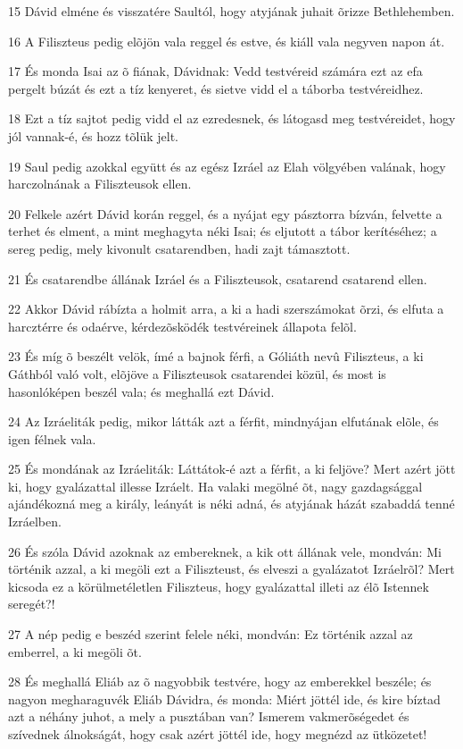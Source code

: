 \par 15 Dávid elméne és visszatére Saultól, hogy atyjának juhait õrizze Bethlehemben.
\par 16 A Filiszteus pedig elõjön vala reggel és estve, és kiáll vala negyven napon át.
\par 17 És monda Isai az õ fiának, Dávidnak: Vedd testvéreid számára ezt az efa pergelt búzát és ezt a tíz kenyeret, és sietve vidd el a táborba testvéreidhez.
\par 18 Ezt a tíz sajtot pedig vidd el az ezredesnek, és látogasd meg testvéreidet, hogy jól vannak-é, és hozz tõlük jelt.
\par 19 Saul pedig azokkal együtt és az egész Izráel az Elah völgyében valának, hogy harczolnának a Filiszteusok ellen.
\par 20 Felkele azért Dávid korán reggel, és a nyájat egy pásztorra bízván, felvette a terhet és elment, a mint meghagyta néki Isai; és eljutott a tábor kerítéséhez; a sereg pedig, mely kivonult csatarendben, hadi zajt támasztott.
\par 21 És csatarendbe állának Izráel és a Filiszteusok, csatarend csatarend ellen.
\par 22 Akkor Dávid rábízta a holmit arra, a ki a hadi szerszámokat õrzi, és elfuta a harcztérre és odaérve, kérdezõsködék testvéreinek állapota felõl.
\par 23 És míg õ beszélt velök, ímé a bajnok férfi, a Góliáth nevû Filiszteus, a ki Gáthból való volt, elõjöve a Filiszteusok csatarendei közül, és most is hasonlóképen beszél vala; és meghallá ezt Dávid.
\par 24 Az Izráeliták pedig, mikor látták azt a férfit, mindnyájan elfutának elõle, és igen félnek vala.
\par 25 És mondának az Izráeliták: Láttátok-é azt a férfit, a ki feljöve? Mert azért jött ki, hogy gyalázattal illesse Izráelt. Ha valaki megölné õt, nagy gazdagsággal ajándékozná meg a király, leányát is néki adná, és atyjának házát szabaddá tenné Izráelben.
\par 26 És szóla Dávid azoknak az embereknek, a kik ott állának vele, mondván: Mi történik azzal, a ki megöli ezt a Filiszteust, és elveszi a gyalázatot Izráelrõl? Mert kicsoda ez a körülmetéletlen Filiszteus, hogy gyalázattal illeti az élõ Istennek seregét?!
\par 27 A nép pedig e beszéd szerint felele néki, mondván: Ez történik azzal az emberrel, a ki megöli õt.
\par 28 És meghallá Eliáb az õ nagyobbik testvére, hogy az emberekkel beszéle; és nagyon megharaguvék Eliáb Dávidra, és monda: Miért jöttél ide, és kire bíztad azt a néhány juhot, a mely a pusztában van? Ismerem vakmerõségedet és szívednek álnokságát, hogy csak azért jöttél ide, hogy megnézd az ütközetet!
